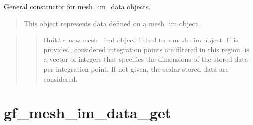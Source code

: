\documentclass[a4paper,11pt,english]{sphinxmanual}
\begin{document}

General constructor for mesh\_im\_data objects.
\begin{quote}

This object represents data defined on a mesh\_im object.
\end{quote}

\begin{quote}

\begin{quote}

Build a new mesh\_imd object linked to a mesh\_im object. If  is
provided, considered integration points are filtered in this region.
 is a vector of integers that specifies the dimensions of the
stored data per integration point. If not given, the scalar stored
data are considered.
\end{quote}
\end{quote}


\section{gf\_mesh\_im\_data\_get}
\label{\detokenize{matlab_octave/cmdref_gf_mesh_im_data_get:gf-mesh-im-data-get}}\label{\detokenize{matlab_octave/cmdref_gf_mesh_im_data_get::doc}}

\begin{sphinxVerbatim}[commandchars=\\\{\}]
  
  
  
  
  
    
\end{sphinxVerbatim}
\end{document}
